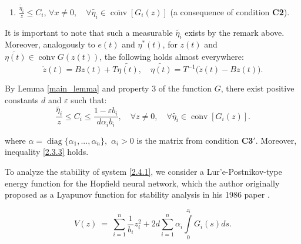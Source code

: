 \documentclass[journal]{IEEEtran}
\begin{document}
\begin{IEEEproof}
\begin{enumerate}
    it follows that $0 \in \overline{\operatorname{conv}}(G(0))$. Thus, by Definition \ref{equilib}, the origin is an equilibrium point of system \eqref{2.4.1};
    \item $ \frac{ \widetilde{\eta_i}}{z} \leqslant C_i $, $\forall x \ne 0, \quad \forall \widetilde{\eta_i} \in  \overline{\operatorname{conv}}[G_i(z)]$ (a consequence of condition \textbf{C2}).
\end{enumerate}

    It is important to note that such a measurable $\widetilde{\eta_i}$ exists by the remark above. Moreover, analogously to $e(t)$ and $\eta^*(t)$, for $z(t)$ and $\widetilde{\eta(t)} \in \overline{\operatorname{conv}}G(z(t))$, the following holds almost everywhere:
\begin{equation}\label{2.4.2}
\dot z (t) = Bz(t) + T \widetilde{\eta(t)}, \quad \widetilde{\eta(t)} = T ^{-1}\big(\dot z(t) - Bz(t)\big).     
\end{equation}

By Lemma \ref{main_lemma} and property 3 of the function $G$, there exist positive constants $d$ and $\varepsilon$ such that:
\begin{equation}\label{2.4.3}
\frac{\widetilde{\eta_i}}{z} \leqslant C_i \leqslant \frac{1 - \varepsilon b_i}{d \alpha_i b_i},\quad \forall z \ne 0,\quad \forall \widetilde{\eta_i} \in  \overline{\operatorname{conv}}[G_i(z)].    
\end{equation}


where $\alpha = \operatorname{diag}\{\alpha_1,...,\alpha_n\},$ $\alpha_i>0$ is the matrix from condition \textbf{C3$'$}.
Moreover, inequality \eqref{2.3.3} holds.

To analyze the stability of system \eqref{2.4.1}, we consider a Lur'e-Postnikov-type energy function \cite{p17} for the Hopfield neural network, which the author originally proposed as a Lyapunov function for stability analysis in his 1986 paper \cite{p10}.

\begin{equation}\label{2.4.4}
V(z) ~= ~\sum\limits_{i=1}^n\frac {1}{b_i}z_i^2 +2d\sum\limits_{i=1}^n\alpha_i\int\limits_0^{z_i}G_i(s)ds.    
\end{equation}


\end{IEEEproof}
\end{document}
